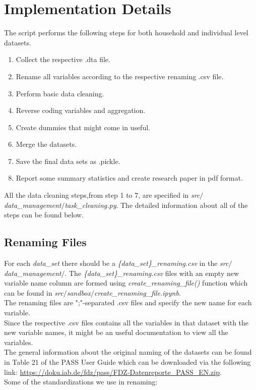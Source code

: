 \documentclass[11pt, a4paper, leqno]{article}
\begin{document}
\section{Implementation Details}\label{section:imp}
The script performs the following steps for both household and individual level datasets.
\begin{enumerate}
\item Collect the respective .dta file.
\item Rename all variables according to the respective renaming .csv file.
\item Perform basic data cleaning.
\item Reverse coding variables and aggregation.
\item Create dummies that might come in useful.
\item Merge the datasets.
\item Save the final data sets as .pickle.
\item Report some summary statistics and create research paper in pdf format.
\end{enumerate}
All the data cleaning steps,from step 1 to 7, are specified in   \emph{src$/$data\_management$/$task\_cleaning.py}.
The detailed information about all of the steps can be found below.

\subsection{Renaming Files}
For each  \emph{data\_set} there should be a  \emph{\{data\_set\}\_renaming.csv} in the   \emph{src$/$data\_management$/$}.
The  \emph{\{data\_set\}\_renaming.csv} files with an empty new variable name column are formed using  \emph{create\_renaming\_file()} function which can be found in   \emph{src$/$sandbox$/$create\_renaming\_file.ipynb}. \\[12pt]
The renaming files are ";"-separated .csv files and specify the new name for each variable.\\[12pt]
Since the respective .csv files contains all the variables in that dataset with the new variable names, it might be an useful documentation to view all the variables.\\[12pt]
The general information about the original naming of the datasets can be found in Table 21 of the PASS User Guide which can be downloaded via the following link: \url{https://doku.iab.de/fdz/pass/FDZ-Datenreporte_PASS_EN.zip}.\\[12pt]
Some of the standardizations we use in renaming:
\end{document}
